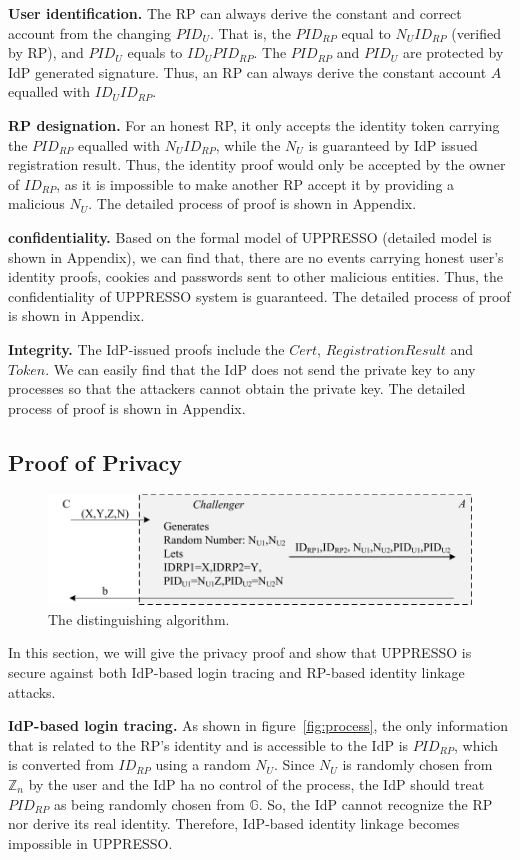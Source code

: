 \noindent\textbf{User identification.}
The RP can always derive the constant and correct account from the changing $PID_U$. That is, the $PID_{RP}$ equal to $N_UID_{RP}$ (verified by RP), and $PID_U$ equals to $ID_UPID_{RP}$. The $PID_{RP}$ and $PID_U$ are protected by IdP generated signature. Thus, an RP can always derive the constant account $A$ equalled with $ID_UID_{RP}$.

\noindent\textbf{RP designation.}
For an honest RP, it only accepts the identity token carrying the $PID_{RP}$ equalled with $N_UID_{RP}$, while the $N_U$ is guaranteed by IdP issued registration result. Thus, the identity proof would only be accepted by the owner of $ID_{RP}$, as it is impossible to make another RP accept it by providing a malicious $N_U$. The detailed process of proof is shown in Appendix.

\noindent\textbf{confidentiality.}
Based on the formal model of UPPRESSO (detailed model is shown in Appendix), we can find that, there are no events carrying honest user's identity proofs, cookies and passwords sent to other malicious entities. Thus, the confidentiality of UPPRESSO system is guaranteed. The detailed process of proof is shown in Appendix.

\noindent\textbf{Integrity.}
The IdP-issued proofs include the $Cert$, $RegistrationResult$ and $Token$. We can easily find that the IdP does not send the private key to any processes so that the attackers cannot obtain the private key. The detailed process of proof is shown in Appendix.

\subsection{Proof of Privacy}
\begin{figure}
  \centering
  \includegraphics[width=0.65\linewidth]{fig/dalgorithm.pdf}
  \caption{The distinguishing algorithm.}
  \vspace{-5mm}
  \label{fig:dalgorithm}
\end{figure}
In this section, we will give the privacy proof and show that UPPRESSO is secure against both IdP-based login tracing and RP-based identity linkage attacks.

\noindent\textbf{IdP-based login tracing.}
As shown in figure~\ref{fig:process}, the only information that is related to the RP's identity and is accessible to the IdP is $PID_{RP}$, which is converted from $ID_{RP}$ using a random $N_U$. Since $N_U$ is randomly chosen from $\mathbb{Z}_n$ by the user and the IdP ha no control of the process, the IdP should treat $PID_{RP}$ as being randomly chosen from $\mathbb{G}$. So, the IdP cannot recognize the RP nor derive its real identity. Therefore, IdP-based identity linkage becomes impossible in UPPRESSO.

